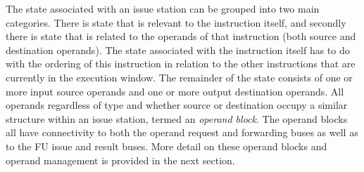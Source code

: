 \documentclass[10pt,dvips]{article}
\begin{document}
The state associated with an issue station can be grouped into
two main categories.  There is state that is relevant to
the instruction itself, and secondly there is state that is
related to the operands of that instruction (both source and
destination operands).
The state associated with the instruction itself has to do
with the ordering of this instruction in relation to the other
instructions that are currently in the execution window.
The remainder of the state consists of one or more input
source operands and one or more output destination operands.
All operands regardless of type and whether source or destination
occupy a similar structure within an issue station, termed an
\textit{operand block}.
The operand blocks all have connectivity to both the
operand request and forwarding buses as well as to the FU
issue and result buses.
More detail on these operand blocks and operand management
is provided in the next section.
\end{document}

